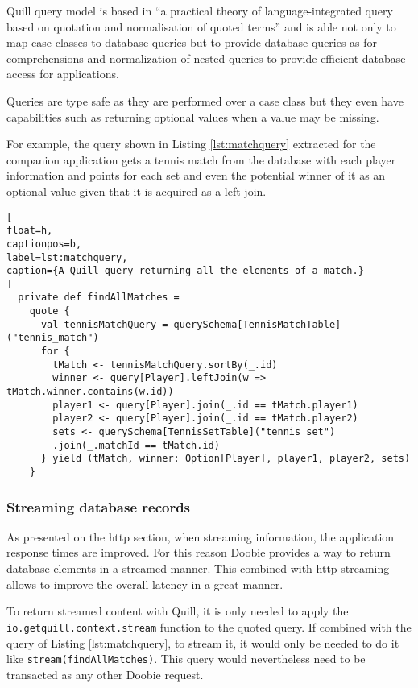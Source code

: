 \documentclass[../main.tex]{subfiles}
\begin{document}
Quill query model is based in ``a  practical  theory  of  language-integrated
query  based  on quotation and normalisation of quoted terms'' \autocite{CheneyAQuery} and
is able not only to map case classes to database queries but to provide
database queries as for comprehensions and normalization of nested queries to
provide efficient database access for applications.

Queries are type safe as they are performed over a case class but they even have
capabilities such as returning optional values when a value may be missing.

For example, the query shown in Listing \ref{lst:matchquery} extracted for the companion application gets a tennis
match from the database with each player information and points for each set and
even the potential winner of it as an optional value given that it is acquired
as a left join.

\begin{lstlisting}[
float=h,
captionpos=b,
label=lst:matchquery,
caption={A Quill query returning all the elements of a match.}
]
  private def findAllMatches =
    quote {
      val tennisMatchQuery = querySchema[TennisMatchTable]("tennis_match")
      for {
        tMatch <- tennisMatchQuery.sortBy(_.id)
        winner <- query[Player].leftJoin(w => tMatch.winner.contains(w.id))
        player1 <- query[Player].join(_.id == tMatch.player1)
        player2 <- query[Player].join(_.id == tMatch.player2)
        sets <- querySchema[TennisSetTable]("tennis_set")
        .join(_.matchId == tMatch.id)
      } yield (tMatch, winner: Option[Player], player1, player2, sets)
    }
\end{lstlisting}

\subsubsection{Streaming database records}
As presented on the http section, when streaming information, the application
response times are improved. For this reason Doobie provides a way to return
database elements in a streamed manner. This combined with http streaming allows
to improve the overall latency in a great manner.

To return streamed content with Quill, it is only needed to apply the
\texttt{io.getquill.context.stream} function to the quoted query. If combined
with the query of Listing \ref{lst:matchquery}, to stream it, it would only be
needed to do it like \texttt{stream(findAllMatches)}. This query would
nevertheless need to be transacted as any other Doobie request.
\end{document}
